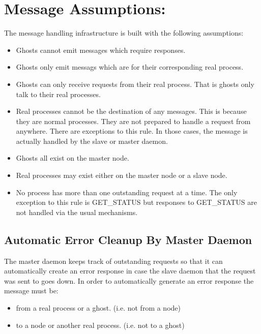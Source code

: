 \section{Message Assumptions:}

The message handling infrastructure is built with the following assumptions:

\begin{itemize}

\item Ghosts cannot emit messages which require responses.

\item Ghosts only emit messags which are for their corresponding real process.

\item Ghosts can only receive requests from their real process.  That
    is ghosts only talk to their real processes.

\item Real processes cannot be the destination of any messages.  This
    is because they are normal processes.  They are not prepared to
    handle a request from anywhere.  There are exceptions to this
    rule.  In those cases, the message is actually handled by the
    slave or master daemon.

\item Ghosts all exist on the master node.

\item Real processes may exist either on the master node or a slave node.

\item No process has more than one outstanding request at a time.  The
    only exception to this rule is GET\_STATUS but responses to
    GET\_STATUS are not handled via the usual mechanisms.

\end{itemize}

\subsection{Automatic Error Cleanup By Master Daemon}

The master daemon keeps track of outstanding requests so that it can
automatically create an error response in case the slave daemon that
the request was sent to goes down.  In order to automatically generate
an error response the message must be:

\begin{itemize}
\item from a real process or a ghost.  (i.e. not from a node)
\item to a node or another real process.  (i.e. not to a ghost)
\end{itemize}

